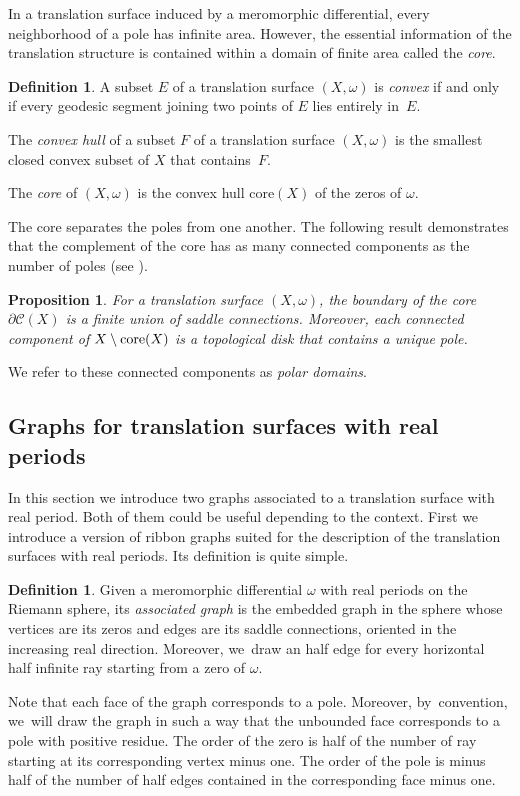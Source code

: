 \documentclass[JEP,XML,SOM,Unicode,NoFloatCountersInSection,published]{cedram}
\newcommand{\core}{\mathrm{core}}
\newtheorem{prop}[thm]{Proposition}
\theoremstyle{definition}
\newtheorem{defn}[thm]{Definition}
\begin{document}
In a translation surface induced by a meromorphic differential, every neighborhood of a pole has infinite area. However, the essential information of the translation structure is contained within a domain of finite area called the \textit{core}.

\begin{defn}\label{defn:core}
A subset $E$ of a translation surface $(X,\omega)$ is \textit{convex} if and only if every geodesic segment joining two points of $E$ lies entirely in~$E$.

The \textit{convex hull} of a subset $F$ of a translation surface $(X,\omega)$ is the smallest closed convex subset of $X$ that contains~$F$.

The \textit{core} of $(X,\omega)$ is the convex hull $\core(X)$ of the zeros of $\omega$.
\end{defn}

The core separates the poles from one another. The following result demonstrates that the complement of the core has as many connected components as the number of poles (see \cite[Prop.\,4.4 \& Lem.\,4.5]{tahar}).

\begin{prop}\label{prop:decomppoles}
For a translation surface $(X,\omega)$, the boundary of the core $\partial\mathcal{C}(X)$ is a finite union of saddle connections. Moreover, each connected component of $X \setminus\nobreak \core(X)$ is a topological disk that contains a unique pole.
\end{prop}
We refer to these connected components as \textit{polar domains}.

\subsection{Graphs for translation surfaces with real periods}\label{sub:RealGraph}
In this section we introduce two graphs associated to a translation surface with real period. Both of them could be useful depending to the context. First we introduce a version of ribbon graphs suited for the description of the translation surfaces with real periods. Its definition is quite simple.
\begin{defn}
Given a meromorphic differential $\omega$ with real periods on the Riemann sphere, its \textit{associated graph} is the embedded graph in the sphere whose vertices are its zeros and edges are its saddle connections, oriented in the increasing real direction. Moreover, we~draw an half edge for every horizontal half infinite ray starting from a zero of $\omega$.
\end{defn}
Note that each face of the graph corresponds to a pole. Moreover, by~convention, we~will draw the graph in such a way that the unbounded face corresponds to a pole with positive residue. The order of the zero is half of the number of ray starting at its corresponding vertex minus one. The order of the pole is minus half of the number of half edges contained in the corresponding face minus one.
\end{document}
